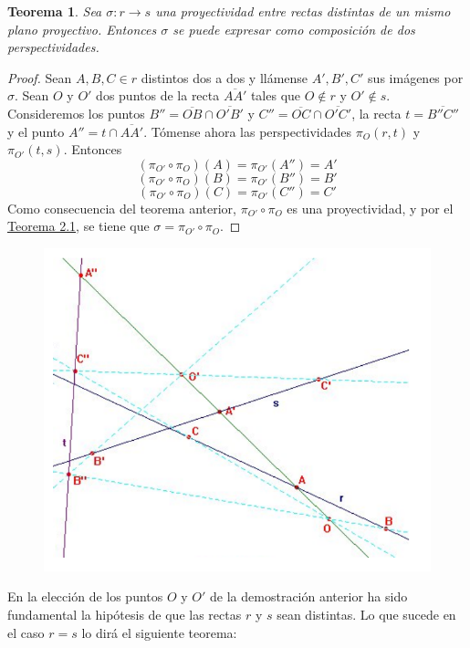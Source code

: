 \documentclass[12pt]{report}
\newtheorem{theorem}{Teorema}[chapter]
\theoremstyle{definition}
\theoremstyle{definition}
\theoremstyle{remark}
\begin{document}
\begin{theorem}
\label{teo2.6.}
Sea $\sigma \colon r \to s$ una proyectividad entre rectas distintas de un mismo plano proyectivo. Entonces $\sigma$ se puede expresar como composición de dos perspectividades.
\end{theorem}

\begin{proof}
Sean $A,B,C \in r$ distintos dos a dos y llámense $A',B',C'$ sus imágenes por $\sigma$. Sean $O$ y $O'$ dos puntos de la recta $\overline{AA'}$ tales que $O \notin r$ y $O' \notin s$. Consideremos los puntos $B'' = \overline{OB} \cap \overline{O'B'}$ y $C'' = \overline{OC} \cap \overline{O'C'}$, la recta $t = \overline{B''C''}$ y el punto $A'' = t \cap \overline{AA'}$. Tómense ahora las perspectividades $\pi_O(r,t)$ y $\pi_{O'}(t,s)$. Entonces
\[(\pi_{O'} \circ \pi_O)(A) = \pi_{O'}(A'') = A'\]
\[(\pi_{O'} \circ \pi_O)(B) = \pi_{O'}(B'') = B'\]
\[(\pi_{O'} \circ \pi_O)(C) = \pi_{O'}(C'') = C'\]
Como consecuencia del teorema anterior, $\pi_{O'} \circ \pi_O$ es una proyectividad, y por el \hyperref[teo2.1.]{\color{blue}Teorema 2.1}, se tiene que $\sigma = \pi_{O'} \circ \pi_O$.
\end{proof}

\begin{figure}[h]
\includegraphics[scale = 0.36]{2.6_2}
\centering
\end{figure}

En la elección de los puntos $O$ y $O'$ de la demostración anterior ha sido fundamental la hipótesis de que las rectas $r$ y $s$ sean distintas. Lo que sucede en el caso $r = s$ lo dirá el siguiente teorema:
\end{document}
